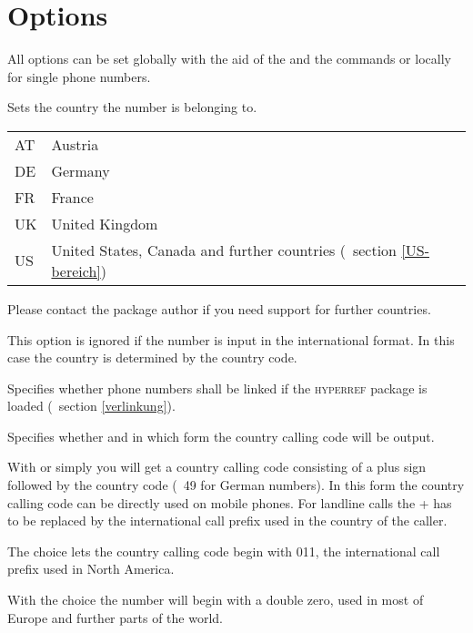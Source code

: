 \documentclass[numbers=noenddot]{scrreprt}
\newcommand*{\Paket}[1]{\textsc{#1}}
\newcommand*{\UeberschriftOptionen}[1]{\section{Options}\label{optionen-#1}}
\newcommand*{\vglAbschnitt}[1]{(\cf\ section \ref{#1})}
\begin{document}
\UeberschriftOptionen{allgemein}
All options can be set globally with the aid of the  and the  commands or locally for single phone numbers.
\begin{Befehlsliste}
Sets the country the number is belonging to.
\begin{center}
\begin{tabular}{>{\ttfamily}ll}
AT & Austria \\
DE & Germany \\
FR & France \\
UK & United Kingdom \\
US & United States, Canada and further countries
\vglAbschnitt{US-bereich}
\end{tabular}
\end{center}
Please contact the package author if you need support for further countries.

This option is ignored if the number is input in the international format. In this case the country is determined by the country code.

Specifies whether phone numbers shall be linked if the \Paket{hyperref} package is loaded
\vglAbschnitt{verlinkung}.

Specifies whether and in which form the country calling code will be output.

With  or simply  you will get a country calling code consisting of a plus sign followed by the country code (\eg\ 49 for German numbers). In this form the country calling code can be directly used on mobile phones. For landline calls the + has to be replaced by the international call prefix used in the country of the caller.
\begin{sidebyside}
\end{sidebyside}
The choice  lets the country calling code begin with 011, the international call prefix used in North America.
\begin{sidebyside}
\end{sidebyside}
With the choice  the number will begin with a double zero, used in most of Europe and further parts of the world.
\begin{sidebyside}
\end{sidebyside}


\end{Befehlsliste}
\end{document}
